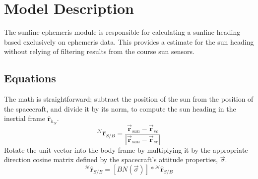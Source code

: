 
\section{Model Description}

The sunline ephemeris module is responsible for calculating a sunline heading based exclusively on ephemeris data. This provides a estimate for the sun heading without relying of filtering results from the course sun sensors. 

\subsection{Equations}
The math is straightforward; subtract the position of the sun from the position of the spacecraft, and divide it by its norm, to compute the sun heading in the inertial frame $\hat{\bm{r}}_{h_N}$. 
\begin{equation}
	{}^{\mathcal N}\hat{\bm{r}}_{S/B} = \frac{\vec{\bm{r}}_{sun}-\vec{\bm{r}}_{sc}}{|\vec{\bm{r}}_{sun} - \vec{\bm{r}}_{sc}|}
\end{equation}
Rotate the unit vector into the body frame by multiplying it by the appropriate direction cosine matrix defined by the spacecraft's attitude properties, $\vec{\sigma}$. 
\begin{equation}
	{}^{\mathcal N}\hat{\bm{r}}_{S/B} = [BN(\vec{\sigma})]*{}^{\mathcal{N}}\hat{\bm{r}}_{S/B}
\end{equation}

